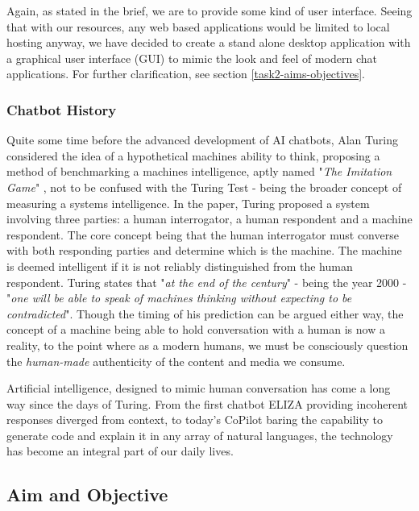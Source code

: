 \documentclass[11pt]{article}
\begin{document}
Again, as stated in the brief, we are to provide some kind of user interface. Seeing that with our resources, any web based applications would be limited to local hosting anyway, we have decided to create a stand alone desktop application with a graphical user interface (GUI) to mimic the look and feel of modern chat applications. For further clarification, see section \ref{task2-aims-objectives}.

\subsubsection{Chatbot History} \label{chatbot-history}

Quite some time before the advanced development of AI chatbots, Alan Turing considered the idea of a hypothetical machines ability to think, proposing a method of benchmarking a machines intelligence, aptly named "\textit{The Imitation Game}" \cite{turing1950}, not to be confused with the Turing Test - being the broader concept of measuring a systems intelligence. In the paper, Turing proposed a system involving three parties: a human interrogator, a human respondent and a machine respondent. The core concept being that the human interrogator must converse with both responding parties and determine which is the machine. The machine is deemed intelligent if it is not reliably distinguished from the human respondent. Turing states that "\textit{at the end of the century}" - being the year 2000 - "\textit{one will be able to speak of machines thinking without expecting to be contradicted}". Though the timing of his prediction can be argued either way, the concept of a machine being able to hold conversation with a human is now a reality, to the point where as a modern humans, we must be consciously question the \textit{human-made} authenticity of the content and media we consume.

Artificial intelligence, designed to mimic human conversation has come a long way since the days of Turing. From the first chatbot ELIZA \cite{eliza} providing incoherent responses diverged from context, to today's CoPilot \cite{copilot} baring the capability to generate code and explain it in any array of natural languages, the technology has become an integral part of our daily lives.


\subsection{Aim and Objective} \label{aim-objective}
\end{document}
